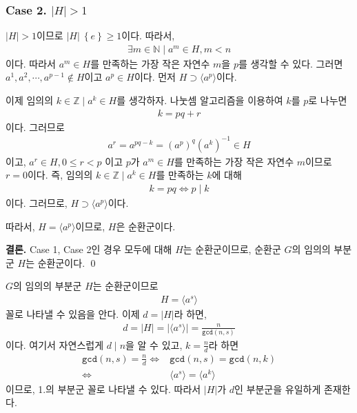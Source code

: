 \documentclass{article}
\begin{document}
\subsubsection{Case 2. $\left|H \right| > 1$}
$\left|H \right| > 1$이므로 $\left|H \right| \ \left\{e\right\} \ge 1$이다. 따라서, 
\begin{align*}
\exists m \in \mathbb{N} \mid a^m \in H, m<n
\end{align*}이다.
따라서 $a^m \in H$를 만족하는 가장 작은 자연수 $m$을 $p$를 생각할 수 있다. 그러면 $a^1, a^2, \cdots, a^{p-1} \notin H$이고 $a^p \in H$이다. 먼저 $H \supset \langle a^p \rangle$이다.

이제 임의의 $k \in \mathbb{Z} \mid a^k \in H$를 생각하자. 나눗셈 알고리즘을 이용하여 $k$를 $p$로 나누면
\begin{align*}
k = pq + r \tag{$0 \le r < p$}
\end{align*}이다. 그러므로
\begin{align*}
a^r = a^{pq - k} = (a^p)^q (a^k)^{-1} \in H
\end{align*}이고, $a^r \in H, 0 \le r < p$ 이고 $p$가 $a^m \in H$를 만족하는 가장 작은 자연수 $m$이므로 $r = 0$이다. 즉, 임의의 $k \in \mathbb{Z} \mid a^k \in H$를 만족하는 $k$에 대해
\begin{align*}
k = pq \iff p \mid k
\end{align*}이다. 그러므로, $H \supset \langle a^p \rangle$이다.

따라서, $H = \langle a^p \rangle$이므로, $H$은 순환군이다.

\textbf{결론.} Case 1, Case 2인 경우 모두에 대해 $H$는 순환군이므로, 순환군 $G$의 임의의 부분군 $H$는 순환군이다. \qed

$G$의 임의의 부분군 $H$는 순환군이므로
\begin{align*}
H = \langle a^s \rangle
\end{align*}꼴로 나타낼 수 있음을 안다. 이제 $d =  \left|H \right|$라 하면,
\begin{align*}
d = \left|H \right| = \left| \langle a^s \rangle \right| = \frac{n}{\texttt{gcd}(n, s)}
\end{align*}이다. 여기서 자연스럽게 $d \mid n$을 알 수 있고, $k = \frac{n}{d}$라 하면
\begin{align*}
\texttt{gcd}(n, s) = \frac{n}{d} \iff&  \texttt{gcd}(n, s) = \texttt{gcd}(n, k)
\\ \iff& \langle a^s \rangle  = \langle a^k \rangle
\end{align*}이므로, 1.의 부분군 꼴로 나타낼 수 있다. 따라서 $\left|H \right|$가 $d$인 부분군을 유일하게 존재한다.
\end{document}
